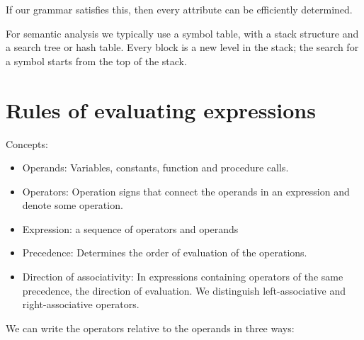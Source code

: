\documentclass[margin=0px]{article}
\begin{document}
If our grammar satisfies this, then every attribute can be efficiently determined.

For semantic analysis we typically use a symbol table, with a stack structure and a search tree or hash table. Every block is a new level in the stack; the search for a symbol starts from the top of the stack.

\section{Rules of evaluating expressions}

\noindent Concepts:
\begin{itemize}
    \item	Operands: Variables, constants, function and procedure calls.

    \item	Operators: Operation signs that connect the operands in an expression and denote some
          operation.

    \item	Expression: a sequence of operators and operands

    \item	Precedence: Determines the order of evaluation of the operations.

    \item	Direction of associativity: In expressions containing operators of the same precedence, the direction of evaluation.
          We distinguish left-associative and right-associative operators.
\end{itemize}

\noindent We can write the operators relative to the operands in three ways:
\end{document}
